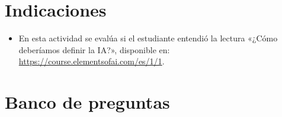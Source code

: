 \documentclass[a4,11pt]{aleph-notas}
\begin{document}
\encabezado

\vspace*{-8mm}
\section{Indicaciones}

\begin{itemize}[leftmargin=*]
\item 
    En esta actividad se evalúa si el estudiante entendió la lectura «¿Cómo deberíamos definir la IA?», disponible en: \url{https://course.elementsofai.com/es/1/1}.

\end{itemize}

\section{Banco de preguntas}
\end{document}
